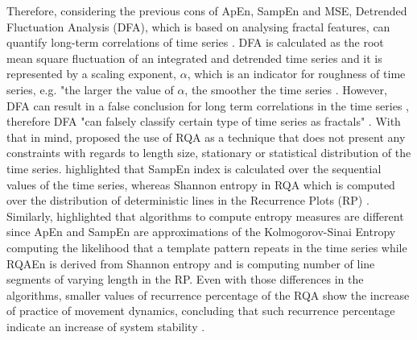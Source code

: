 Therefore, considering the previous cons of ApEn, SampEn and MSE, Detrended 
Fluctuation Analysis (DFA), which is based on analysing fractal features, 
can quantify long-term correlations of time series \citep{peng1995}.
DFA is calculated as the root mean square fluctuation of an integrated 
and detrended time series and it is represented by a scaling exponent, 
$\alpha$, which is an indicator for roughness of time series,
e.g. "the larger the value of $\alpha$, the smoother the time series 
\citep[p. 83]{peng1995}.
However, DFA can result in a false conclusion for long term 
correlations in the time series \cite[p. 5001]{rangarajan2000}, therefore 
DFA "can falsely classify certain type of time series as fractals" 
\cite[p. 80]{wijnants2009}.
With that in mind, \cite{wijnants2009} proposed the use of RQA as a 
technique that does not present any constraints with regards to length size,
stationary or statistical distribution of the time series.
\cite{wijnants2009} highlighted that  SampEn index is calculated 
over the sequential values of the time series, whereas Shannon entropy in 
RQA which is computed over the distribution of deterministic lines in 
the Recurrence Plots (RP) \citep{marwan2008, trulla1996, zbilut1992}.
Similarly, \cite{rhea2011} highlighted that algorithms to compute entropy 
measures are different since ApEn and SampEn are approximations of the 
Kolmogorov-Sinai Entropy computing the likelihood that a template pattern 
repeats in the time series while RQAEn is derived from Shannon entropy 
and is computing number of line segments of varying length in the RP.
Even with those differences in the algorithms, smaller values of 
recurrence percentage of the RQA show the increase of practice of movement
dynamics, concluding that such recurrence percentage indicate an 
increase of system stability \citep{wijnants2009}.







